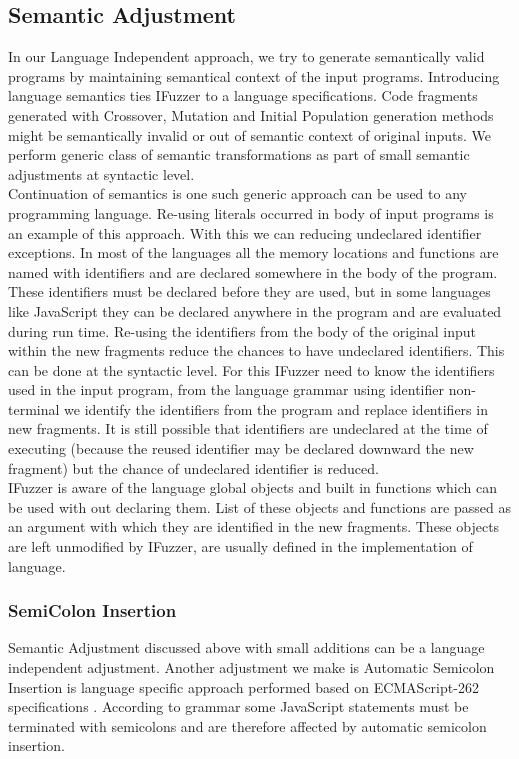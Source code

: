 \documentclass{acm_proc_article-sp}
\begin{document}
\subsection{Semantic Adjustment} \label{semantics}
In our Language Independent approach, we try to generate semantically valid programs by maintaining semantical context of the input programs. Introducing language semantics ties IFuzzer to a language specifications. Code fragments generated with Crossover, Mutation and Initial Population generation   methods might be semantically invalid or out of semantic context of original inputs. We perform generic class of semantic transformations as part of small semantic adjustments at syntactic level. \\
\indent Continuation of semantics is one such generic approach can be used to any programming language. Re-using literals occurred in body of input programs is an example of this approach. With this we can reducing undeclared identifier exceptions. In most of the languages all the memory locations and functions are named with identifiers and are declared somewhere in the body of the program. These identifiers must be declared before they are used, but in some languages like JavaScript they can be declared anywhere in the program and are evaluated during run time. Re-using the identifiers from the body of the original input within the new fragments reduce the chances to have undeclared identifiers. This can be done at the syntactic level. For this IFuzzer need to know the identifiers used in the input program, from the language grammar using identifier non-terminal we identify the identifiers from the program and replace identifiers in new fragments. It is still possible that identifiers are undeclared at the time of executing (because the reused identifier may be declared downward the new fragment) but the chance of undeclared identifier is reduced. \\
\indent IFuzzer is aware of the language global objects and built in functions which can be used with out declaring them. List of these objects and functions are passed as an argument with which they are identified in the new fragments. These objects are left unmodified by IFuzzer, are usually defined in the implementation of language.

\subsubsection*{\textbf{SemiColon Insertion}}
Semantic Adjustment discussed above with small additions can be a language independent adjustment. Another adjustment we make is Automatic Semicolon Insertion is language specific approach performed based on ECMAScript-262 specifications \cite{EcmaScript}. According to grammar some JavaScript statements must be terminated with semicolons and are therefore affected by automatic semicolon insertion. 
\end{document}
